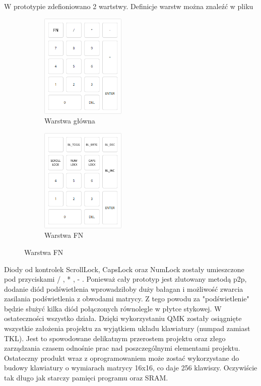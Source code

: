 \documentclass{article}
\begin{document}
    W prototypie zdefioniowano 2 wartstwy. Definicje warstw można znaleźć w pliku

    \begin{figure}[h]
        \centering
        \begin{subfigure}{0.45\textwidth}
            \centering
        \includegraphics[height=5cm]{l1.png} 
        \caption{Warstwa główna}
        \label{fig:subim1}
        \end{subfigure}
        \begin{subfigure}{0.45\textwidth}
            \centering
            \includegraphics[height=5cm]{l2.png}
            \caption{Warstwa FN}
            \label{fig:subim2}
        \end{subfigure}
        \end{figure}
    Diody od kontrolek ScrollLock, CapsLock oraz NumLock zostały umieszczone pod przyciskami / , * , - .
    Ponieważ cały prototyp jest zlutowany metodą p2p, dodanie diód podświetlenia wprowadziłoby duży bałagan i możliwość zwarcia zasilania podświetlenia z
    obwodami matrycy. Z tego powodu za "podświetlenie" będzie służyć kilka diód połączonych równolegle w płytce stykowej.
    W ostateczności wszystko działa. Dzięki wykorzystaniu QMK zostały osiągnięte wszystkie założenia projektu za wyjątkiem układu klawiatury (numpad zamiast TKL).
    Jest to spowodowane delikatnym przerostem projektu oraz złego zarządzania czasem odnośnie prac nad poszczególnymi elementami projektu.
    Ostateczny produkt wraz z oprogramowaniem może zostać wykorzystane do budowy klawiatury o wymiarach matrycy 16x16, co daje 256 klawiszy. Oczywiście tak długo
    jak starczy pamięci programu oraz SRAM.
\end{document}
